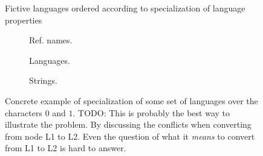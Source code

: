 \documentclass{scrreprt}
\begin{document}
\begin{figure}[h]
  \centering

  \caption{Fictive languages ordered according to specialization of language properties}
  \label{fig:fictive-specialization-tree}
\end{figure}




\begin{figure}[h]
\centering

  \begin{subfigure}{.33\textwidth}
    \centering


    \caption{Ref. names.}
    \label{fig:fictive-specialization-tree-example-ref}
  \end{subfigure}%
  \begin{subfigure}{.33\textwidth}
    \centering

    \caption{Languages.}
    \label{fig:fictive-specialization-tree-example-languages}

  \end{subfigure}%
  \begin{subfigure}{.33\textwidth}
    \centering


    \caption{Strings.}
    \label{fig:fictive-specialization-tree-example-run}
  \end{subfigure}

  \caption{Concrete example of specialization of some set of languages over the characters $0$ and $1$. TODO: This is probably the best way to illustrate the problem. By discussing the conflicts when converting from node L1 to L2. Even the question of what it \emph{means} to convert from L1 to L2 is hard to answer.}
  \label{fig:fictive-specialization-tree-example}
\end{figure}
\end{document}
